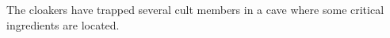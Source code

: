 The cloakers have trapped several cult members in a cave where some critical ingredients are located.
